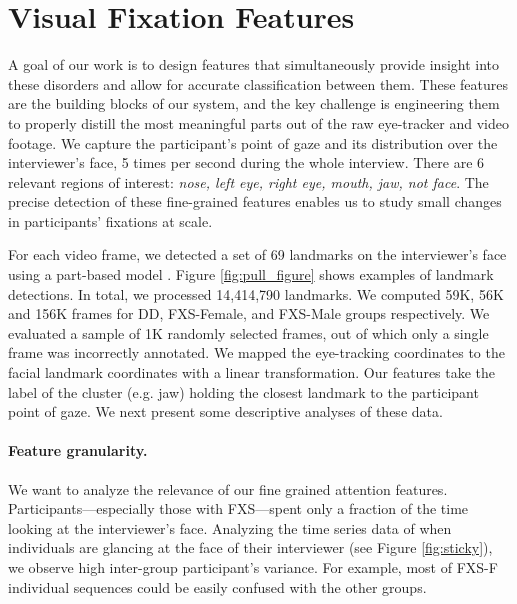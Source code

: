 \documentclass{llncs}
\begin{document}
  \vspace{-2 em}
  \section{Visual Fixation Features}
  \vspace{-1 em}
  \label{sec:feature_extraction}
A goal of our work is to design features that simultaneously provide insight into these disorders and allow for accurate classification between them. These features are the building blocks of our system, and the key challenge is engineering them to properly distill the most meaningful parts out of the raw eye-tracker and video footage. We capture the participant's point of gaze and its distribution over the interviewer's face, 5 times per second during the whole interview. There are 6 relevant regions of interest: \textit{nose, left eye, right eye, mouth, jaw, {\color{red} not face}}. The precise detection of these fine-grained features enables us to study small changes in participants' fixations at scale.


For each video frame, we detected a set of 69 landmarks on the interviewer's face using a part-based model \cite{dpmface}. Figure \ref{fig:pull_figure} shows examples of landmark detections. In total, we processed 14,414,790 landmarks. %
We computed 59K, 56K and 156K frames for DD, FXS-Female, and FXS-Male groups respectively. We evaluated a sample of 1K randomly selected frames, out of which only a single frame was incorrectly annotated. We mapped the eye-tracking coordinates to the facial landmark coordinates with a linear transformation. Our features take the label of the cluster (e.g. jaw) holding the closest landmark to the participant point of gaze. We next present some descriptive analyses of these data.


\paragraph{Feature granularity.} We want to analyze the relevance of our fine grained attention features.
Participants---especially those with FXS---spent only a fraction of the time {\color{red} looking} at the interviewer's face. Analyzing the time series data of when individuals are glancing at the face of their interviewer (see Figure \ref{fig:sticky}), we observe high inter-group participant's variance. For example, most of FXS-F individual sequences could be easily confused with the other groups.
\end{document}
